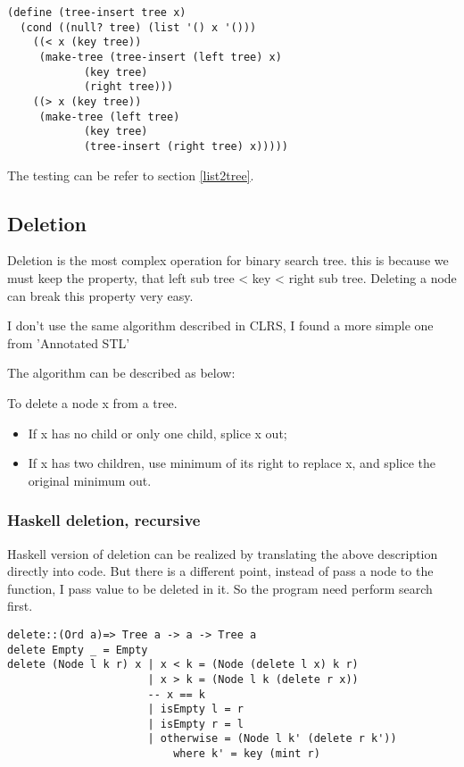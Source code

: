 \documentclass{article}
\begin{document}
\lstset{language=lisp}
\begin{lstlisting}
(define (tree-insert tree x)
  (cond ((null? tree) (list '() x '()))
	((< x (key tree))
	 (make-tree (tree-insert (left tree) x)
		    (key tree)
		    (right tree)))
	((> x (key tree))
	 (make-tree (left tree)
		    (key tree)
		    (tree-insert (right tree) x)))))
\end{lstlisting}

The testing can be refer to section \ref{list2tree}.

\subsection{Deletion}
Deletion is the most complex operation for binary search tree. this is because we
must keep the property, that left sub tree < key < right sub tree. Deleting a node
can break this property very easy.

I don't use the same algorithm described in CLRS\cite{CLRS}, I found a more simple
one from 'Annotated STL'\cite{hj-stl}

The algorithm can be described as below:

To delete a node x from a tree.
\begin{itemize}
\item If x has no child or only one child, splice x out;
\item If x has two children, use minimum of its right to replace x, 
and splice the original minimum out.
\end{itemize}

\subsubsection*{Haskell deletion, recursive}

Haskell version of deletion can be realized by translating the above description
directly into code. But there is a different point, instead of pass a node to the
function, I pass value to be deleted in it. So the program need perform search first.

\lstset{language=Haskell}
\begin{lstlisting}
delete::(Ord a)=> Tree a -> a -> Tree a
delete Empty _ = Empty
delete (Node l k r) x | x < k = (Node (delete l x) k r)
                      | x > k = (Node l k (delete r x))
                      -- x == k
                      | isEmpty l = r
                      | isEmpty r = l
                      | otherwise = (Node l k' (delete r k')) 
                          where k' = key (mint r)
\end{lstlisting}
\end{document}
